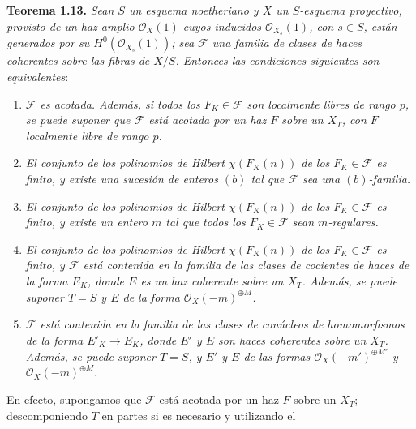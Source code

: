
\textbf{Teorema 1.13.} \emph{Sean \(S\) un esquema noetheriano y \(X\) un
\(S\)-esquema proyectivo, provisto de un haz amplio \(\mathcal O_X(1)\)
cuyos inducidos \(\mathcal O_{X_s}(1)\), con \(s\in S\), están generados por
su \(H^0(\mathcal O_{X_s}(1))\); sea \(\mathcal F\) una familia de clases de
haces coherentes sobre las fibras de \(X/S\). Entonces las condiciones
siguientes son equivalentes}:
\begin{enumerate}[label=(\roman*)]
\item \emph{\(\mathcal F\) es acotada. Además, si todos los
\(F_K\in\mathcal F\) son localmente libres de rango \(p\), se puede suponer
que \(\mathcal F\) está acotada por un haz \(F\) sobre un \(X_T\), con \(F\)
localmente libre de rango \(p\).}
\item \emph{El conjunto de los polinomios de Hilbert \(\chi(F_K(n))\) de los
\(F_K\in\mathcal F\) es finito, y existe una sucesión de enteros \((b)\) tal
que \(\mathcal F\) sea una \((b)\)-familia.}
\item \emph{El conjunto de los polinomios de Hilbert \(\chi(F_K(n))\) de los
\(F_K\in\mathcal F\) es finito, y existe un entero \(m\) tal que todos los
\(F_K\in\mathcal F\) sean \(m\)-regulares.}
\item \emph{El conjunto de los polinomios de Hilbert \(\chi(F_K(n))\) de los
\(F_K\in\mathcal F\) es finito, y \(\mathcal F\) está contenida en la
familia de las clases de cocientes de haces de la forma \(E_K\), donde \(E\)
es un haz coherente sobre un \(X_T\). Además, se puede suponer \(T=S\) y
\(E\) de la forma \(\mathcal O_X(-m)^{\oplus M}\).}
\item \emph{\(\mathcal F\) está contenida en la familia de las clases de
conúcleos de homomorfismos de la forma \(E'_K\to E_K\), donde \(E'\) y \(E\)
son haces coherentes sobre un \(X_T\). Además, se puede suponer \(T=S\), y
\(E'\) y \(E\) de las formas \(\mathcal O_X(-m')^{\oplus M'}\) y
\(\mathcal O_X(-m)^{\oplus M}\).}
\end{enumerate}
En efecto, supongamos que \(\mathcal F\) está acotada por un haz \(F\) sobre
un \(X_T\); descomponiendo \(T\) en partes si es necesario y utilizando el
